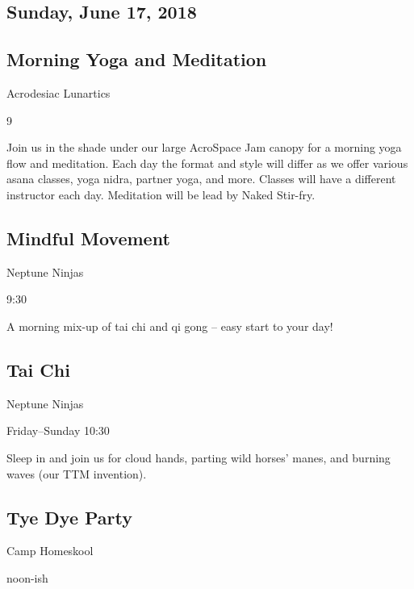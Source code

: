 \begin{multicols}{2}
\columnbreak
\section*{Sunday, June 17, 2018}
\subsection*{Morning Yoga and Meditation}
\begin{description}[leftmargin=6em,noitemsep,style=nextline]
	\item[Camp:] Acrodesiac Lunartics
  \item[Times:] 9\am
\end{description}

Join us in the shade under our large AcroSpace Jam canopy for a morning yoga flow and meditation. Each day the format and style will differ as we offer various asana classes, yoga nidra, partner yoga, and more. Classes will have a different instructor each day. Meditation will be lead by Naked Stir-fry. 

\subsection*{Mindful Movement}
\begin{description}[leftmargin=6em,noitemsep,style=nextline]
	\item[Camp:] Neptune Ninjas
  \item[Times:] 9:30\am
\end{description}

A morning mix-up of tai chi and qi gong – easy start to your day!

\subsection*{Tai Chi}
\begin{description}[leftmargin=6em,noitemsep,style=nextline]
	\item[Camp:] Neptune Ninjas
  \item[Times:] Friday--Sunday 10:30\am
\end{description}

Sleep in and join us for cloud hands, parting wild horses’ manes, and burning waves (our TTM invention). 

\subsection*{Tye Dye Party}
\begin{description}[leftmargin=6em,noitemsep,style=nextline]
	\item[Camp:] Camp Homeskool
  \item[Times:] noon-ish
\end{description}


\end{multicols}
